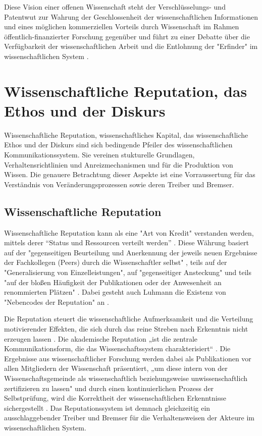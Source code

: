 Diese Vision einer offenen Wissenschaft steht der Verschlüsselungs- und Patentwut zur Wahrung der Geschlossenheit der wissenschaftlichen Informationen und eines möglichen kommerziellen Vorteils durch Wissenschaft im Rahmen öffentlich-finanzierter Forschung gegenüber und führt zu einer Debatte über die Verfügbarkeit der wissenschaftlichen Arbeit und die Entlohnung der "Erfinder" im wissenschaftlichen System \cite{suchen}.

\section{Wissenschaftliche Reputation, das Ethos und der Diskurs}

Wissenschaftliche Reputation, wissenschaftliches Kapital, das wissenschaftliche Ethos und der Diskurs sind sich bedingende Pfeiler des wissenschaftlichen Kommunikationssystem. Sie vereinen stukturelle Grundlagen, Verhaltensrichtlinien und Anreizmechanismen und für die Produktion von Wissen. Die genauere Betrachtung dieser Aspekte ist eine Vorraussertung für das Verständnis von Veränderungsprozessen sowie deren Treiber und Bremser.

\subsection{Wissenschaftliche Reputation}

Wissenschaftliche Reputation kann als eine "Art von Kredit" \cite{luhmann_1970_selbststeuerung} verstanden werden, mittels derer “Status und Ressourcen verteilt werden” \cite{hanekop_2006}. Diese Währung basiert auf der "gegenseitigen Beurteilung und Anerkennung der jeweils neuen Ergebnisse der Fachkollegen (Peers) durch die Wissenschaftler selbst" \cite{Hanekop_2014} \cite{suchen_Hornbostel_2006}, teils auf der "Generalisierung von Einzelleistungen", auf "gegenseitiger Ansteckung" und teils "auf der bloßen Häufigkeit der Publikationen oder der Anwesenheit an renommierten Plätzen" \cite{luhmann_1970_selbststeuerung}. Dabei gesteht auch Luhmann die Existenz von "Nebencodes der Reputation" an \cite{schmoch_2003_hochschulforschung}.

Die Reputation steuert die wissenschaftliche Aufmerksamkeit und die Verteilung motivierender Effekten, die sich durch das reine Streben nach Erkenntnis nicht erzeugen lassen \cite{suchen_luhmann}. Die akademische Reputation „ist die zentrale Kommunikationsform, die das Wissenschaftssystem charakterisiert“ \cite{Rutenfranz_1997}. Die Ergebnisse aus wissenschaftlicher Forschung werden dabei als Publikationen vor allen Mitgliedern der Wissenschaft präsentiert, „um diese intern von der Wissenschaftsgemeinde als wissenschaftlich beziehungsweise unwissenschaftlich zertifizieren zu lassen" \cite{Rutenfranz_1997} und durch einen kontinuierlichen Prozess der Selbstprüfung, wird die Korrektheit der wissenschaftlichen Erkenntnisse sichergestellt \cite{edsall_1976_scientific}. Das Reputationssystem ist demnach gleichzeitig ein ausschlaggebender Treiber und Bremser für die Verhaltensweisen der Akteure im wissenschaftlichen System.

